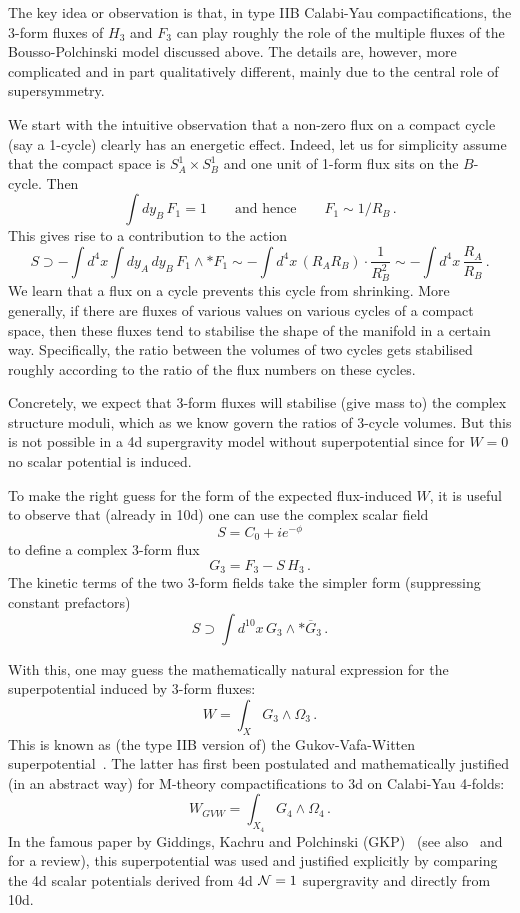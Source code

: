 \documentclass[12pt]{article}
\newcommand{\be}{\begin{equation}}
\newcommand{\ee}{\end{equation}}
\newcommand{\ol}{\overline}
\numberwithin{equation}{section}
\begin{document}
The key idea or observation is that, in type IIB Calabi-Yau compactifications, the 3-form fluxes of $H_3$ and $F_3$ can play roughly the role of the multiple fluxes of the Bousso-Polchinski model discussed above. The details are, however, more complicated and in part qualitatively different, mainly due to the central role of supersymmetry. 

We start with the intuitive observation that a non-zero flux on a compact cycle (say a 1-cycle) clearly has an energetic effect. Indeed, let us for simplicity assume that the compact space is $S^1_A\times S^1_B$ and one unit of 1-form flux sits on the $B$-cycle. Then
\be
\int dy_B\, F_1=1\qquad\mbox{and hence}\qquad F_1\sim 1/R_B\,. 
\ee
This gives rise to a contribution to the action
\be
S\supset -\int d^4x \int dy_A\,dy_B\, F_1\wedge *F_1\sim -\int d^4x\,(R_A R_B)\cdot\frac{1}{R_B^2}\sim  -\int d^4x\,\frac{R_A}{R_B}\,.
\ee
We learn that a flux on a cycle prevents this cycle from shrinking. More generally, if there are fluxes of various values on various cycles of a compact space, then these fluxes tend to stabilise the shape of the manifold in a certain way. Specifically, the ratio between the volumes of two cycles gets stabilised roughly according to the ratio of the flux numbers on these cycles. 

Concretely, we expect that 3-form fluxes will stabilise (give mass to) the complex structure moduli, which as we know govern the ratios of 3-cycle volumes. But this is not possible in a 4d supergravity model without superpotential since for $W=0$ no scalar potential is induced.

To make the right guess for the form of the expected flux-induced $W\!$, it is useful to observe that (already in 10d) one can use the complex scalar field
\be
S=C_0+ie^{-\phi}
\ee
to define a complex 3-form flux
\be
G_3=F_3-S\,H_3\,.
\ee
The kinetic terms of the two 3-form fields take the simpler form (suppressing constant prefactors)
\be
S\supset \int d^{10}x\,G_3\wedge *\ol{G}_3\,.
\ee

With this, one may guess the mathematically natural expression for the superpotential induced by 3-form fluxes:
\be
W=\int_X G_3\wedge\Omega_3\,.
\ee
This is known as (the type IIB version of) the Gukov-Vafa-Witten superpotential~\cite{Gukov:1999ya}. The latter has first been postulated and mathematically justified (in an abstract way) for M-theory compactifications to 3d on Calabi-Yau 4-folds:
\be
W_{GVW}=\int_{X_4} G_4\wedge \Omega_4\,.
\ee
In the famous paper by Giddings, Kachru and Polchinski (GKP)~\cite{Giddings:2001yu} (see also~\cite{Dasgupta:1999ss} and \cite{Grana:2005jc} for a review), this superpotential was used and justified explicitly by comparing the 4d scalar potentials derived from 4d ${\cal N}=1$ supergravity and directly from 10d. 
\end{document}
